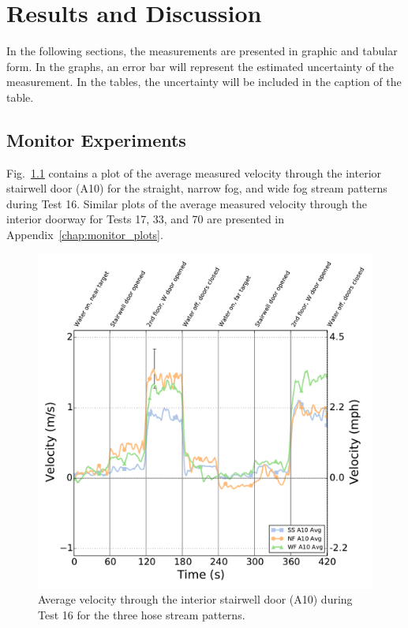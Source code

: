 \documentclass[12pt,oneside]{book}
\begin{document}

\chapter{Results and Discussion}
\label{chap:results}
In the following sections, the measurements are presented in graphic and tabular form. In the graphs, an error bar will represent the estimated uncertainty of the measurement. In the tables, the uncertainty will be included in the caption of the table.

\section{Monitor Experiments}
\label{sec:monitor_results}

Fig.~\ref{fig:Test_16_BDP_A10_Avg_All} contains a plot of the average measured velocity through the interior stairwell door (A10) for the straight, narrow fog, and wide fog stream patterns during Test 16. Similar plots of the average measured velocity through the interior doorway for Tests 17, 33, and 70 are presented in Appendix~\ref{chap:monitor_plots}.

\begin{figure}[!ht]
	\includegraphics[width=\columnwidth]{../Figures/Plots/Test_16_West_063014_BDP_A10_stream_avgs}
	\caption{Average velocity through the interior stairwell door (A10) during Test 16 for the three hose stream patterns.}
	\label{fig:Test_16_BDP_A10_Avg_All}
\end{figure}
\end{document}
